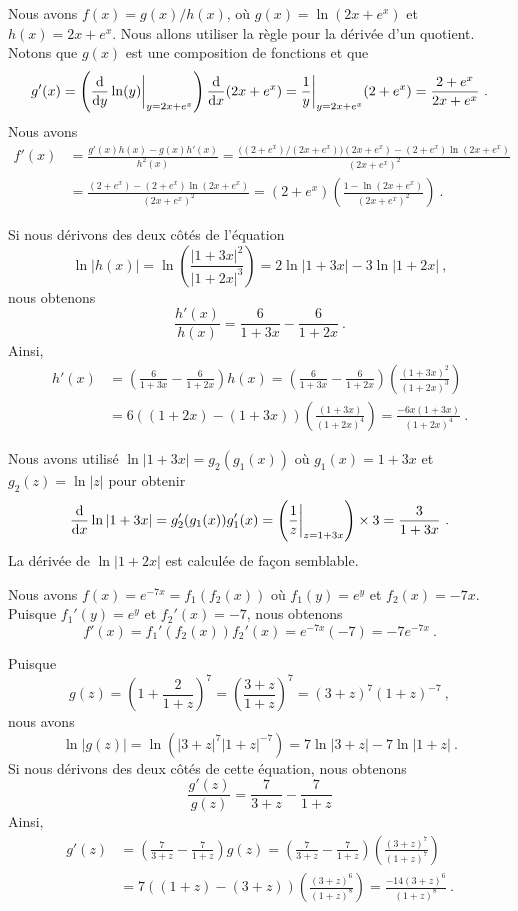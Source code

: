 { Nous avons $f(x) = g(x)/h(x)$, où $g(x)=\ln(2x+e^x)$ et $h(x)= 2x+e^x$.
Nous allons utiliser la règle pour la dérivée d'un quotient.  Notons
que $g(x)$ est une composition de fonctions et que
\[
g'(x) = \left( \dfdx{\ln(y)}{y}\bigg|_{y=2x+e^x}\right)\dfdx{(2x + e^x)}{x}
= \frac{1}{y}\bigg|_{y=2x+e^x} (2+e^x) = \frac{2+e^x}{2x+e^x} \ .
\]
Nous avons
\begin{align*}
f'(x) &= \frac{g'(x) h(x) - g(x)h'(x)}{ h^2(x)}
= \frac{ \big((2+e^x)/(2x+e^x)\big)(2x+e^x)
- (2+e^x) \ln(2x+e^x)}{(2x+e^x)^2} \\
&= \frac{ (2+e^x) - (2+e^x) \ln(2x+e^x)}{(2x+e^x)^2}
= (2+e^x) \left( \frac{  1- \ln(2x+e^x)}{(2x+e^x)^2} \right) \ .
\end{align*}

 Si nous dérivons des deux côtés de l'équation
\[
\ln|h(x)| = \ln\left(\frac{|1+3x|^2}{|1+2x|^3}\right)
= 2 \ln|1+3x| - 3\ln|1+2x| \ ,
\]
nous obtenons
\[
\frac{h'(x)}{h(x)} = \frac{6}{1+3x} - \frac{6}{1+2x} \ .
\]
Ainsi,
\begin{align*}
h'(x) &= \left( \frac{6}{1+3x} - \frac{6}{1+2x}\right) h(x)
= \left(\frac{6}{1+3x} - \frac{6}{1+2x}\right)
\left(\frac{(1+3x)^2}{(1+2x)^3}\right) \\
&= 6 \left( (1+2x) - (1+3x) \right) \left(\frac{(1+3x)}{(1+2x)^4}\right)
= \frac{-6x (1+3x)}{(1+2x)^4} \ .
\end{align*}

Nous avons utilisé $\ln|1 +3x| = g_2(g_1(x))$ où
$g_1(x) = 1+3x$ et $g_2(z)=\ln|z|$ pour obtenir
\[
\dfdx{\ln|1+3x|}{x} = g_2'(g_1(x)) g_1'(x)
= \left(\frac{1}{z}\bigg|_{z=1+3x}\right) \times 3 = \frac{3}{1+3x} \ .
\]
La dérivée de $\ln|1+2x|$ est calculée de façon semblable.

 Nous avons $\displaystyle f(x) = e^{-7x} = f_1(f_2(x))$ où
$f_1(y)=e^y$ et
$f_2(x) = -7x$.  Puisque $f_1'(y) = e^y$ et $f_2'(x) = -7$, nous obtenons
\[
f'(x) = f_1'(f_2(x)) f_2'(x) = e^{-7x} (-7) = - 7 e^{-7x} \ .
\]

 Puisque
\[
g(z) = \left(1 + \frac{2}{1+z}\right)^7 = \left(\frac{3+z}{1+z}\right)^7
= (3+z)^7 (1+z)^{-7} \ ,
\]
nous avons
\[
\ln|g(z)| = \ln\left(|3+z|^7 |1+z|^{-7}\right)
= 7\ln|3+z| - 7 \ln|1+z| \ .
\]
Si nous dérivons des deux côtés de cette équation, nous obtenons
\[
\frac{g'(z)}{g(z)} = \frac{7}{3+z} - \frac{7}{1+z}
\]
Ainsi,
\begin{align*}
g'(z) &= \left( \frac{7}{3+z} - \frac{7}{1+z}\right) g(z)
= \left(\frac{7}{3+z} - \frac{7}{1+z}\right)
\left(\frac{(3+z)^7}{(1+z)^7}\right) \\
&= 7 \left( (1+z) - (3+z) \right) \left(\frac{(3+z)^6}{(1+z)^8}\right)
= \frac{-14 (3+z)^6}{(1+z)^8} \ .
\end{align*}

}
